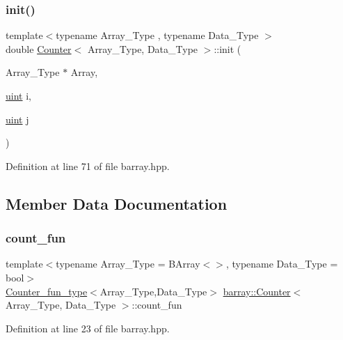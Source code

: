 \subsubsection{\texorpdfstring{init()}{init()}}
{\footnotesize\ttfamily template$<$typename Array\+\_\+\+Type , typename Data\+\_\+\+Type $>$ \\
double \hyperlink{classbarray_1_1_counter}{Counter}$<$ Array\+\_\+\+Type, Data\+\_\+\+Type $>$\+::init (\begin{DoxyParamCaption}\item[{Array\+\_\+\+Type $\ast$}]{Array,  }\item[{\hyperlink{namespacebarray_af9756a31953db233f80a9cfe1ef31c32}{uint}}]{i,  }\item[{\hyperlink{namespacebarray_af9756a31953db233f80a9cfe1ef31c32}{uint}}]{j }\end{DoxyParamCaption})\hspace{0.3cm}{\ttfamily [inline]}}



Definition at line 71 of file barray.\+hpp.



\subsection{Member Data Documentation}
\mbox{\label{classbarray_1_1_counter_a3da828c8a55302a3cbda73bb46916c36}} 
\subsubsection{\texorpdfstring{count\+\_\+fun}{count\_fun}}
{\footnotesize\ttfamily template$<$typename Array\+\_\+\+Type  = B\+Array$<$$>$, typename Data\+\_\+\+Type  = bool$>$ \\
\hyperlink{namespacebarray_a94903bd0f37708633933ea88ac8e4c6a}{Counter\+\_\+fun\+\_\+type}$<$Array\+\_\+\+Type,Data\+\_\+\+Type$>$ \hyperlink{classbarray_1_1_counter}{barray\+::\+Counter}$<$ Array\+\_\+\+Type, Data\+\_\+\+Type $>$\+::count\+\_\+fun}



Definition at line 23 of file barray.\+hpp.

\mbox{\label{classbarray_1_1_counter_a8889606c8da26b72927ccc964a5f844a}} 
